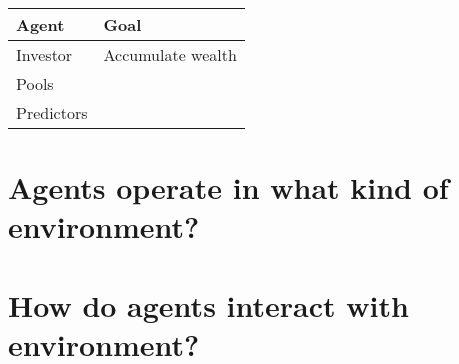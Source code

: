 \documentclass[]{article}
\begin{document}
\begin{tabular}{|l|l|} \hline
	Agent&Goal\\ \hline
	Investor & Accumulate wealth\\ \hline
	Pools & \\ \hline
	Predictors & \\ \hline
\end{tabular}


\section{Agents operate in what kind of environment?}
\section{How do agents interact with environment?}

\medskip



\end{document}
